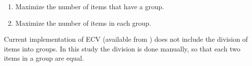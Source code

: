 \begin{enumerate}
\item Maximize the number of items that have a group.
\item Maximize the number of items in each group.
\end{enumerate}

Current implementation of ECV (available from \cite{Rinkevics2011}) does not include the division of items into groups.
In this study the division is done manually, so that each two items in a group are equal.


